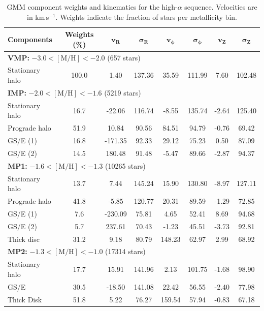 \documentclass[a4paper,12pt]{article}
\begin{document}
\begin{table}[H]
\centering
\begin{tabular}{lccccccc}
\hline
\textbf{Components} & \textbf{Weights (\%)} & $\mathbf{v_R}$ & $\boldsymbol{\sigma_R}$ & $\mathbf{v_\phi}$ & $\boldsymbol{\sigma_\phi}$ & $\mathbf{v_Z}$ & $\boldsymbol{\sigma_Z}$ \\
\hline
\multicolumn{8}{l}{\textbf{VMP:} $-3.0 < \mathrm{[M/H]} < -2.0$ (657 stars)} \\
Stationary halo     & 100.0 &   1.40 & 137.36 &  35.59 & 111.99 &  7.60 & 102.48 \\
\hline
\multicolumn{8}{l}{\textbf{IMP:} $-2.0 < \mathrm{[M/H]} < -1.6$ (5219 stars)} \\
Stationary halo     &  16.7 & -22.06 & 116.74 &  -8.55 & 135.74 & -2.64 & 125.40 \\
Prograde halo       &  51.9 &  10.84 &  90.56 &  84.51 &  94.79 & -0.76 &  69.42 \\
GS/E (1)            &  16.8 &-171.35 &  92.33 &  29.12 &  75.23 &  0.50 &  87.09 \\
GS/E (2)            &  14.5 & 180.48 &  91.48 &  -5.47 &  89.66 & -2.87 &  94.37 \\
\hline
\multicolumn{8}{l}{\textbf{MP1:} $-1.6 < \mathrm{[M/H]} < -1.3$ (10265 stars)} \\
Stationary halo     &   13.7 &   7.44 & 145.24 &  15.90 & 130.80 & -8.97 & 127.11 \\
Prograde halo       &   41.8 &  -5.85 & 120.77 &  20.31 &  89.59 & -1.29 &  72.85 \\
GS/E (1)            &   7.6 &-230.09 &  75.81 &   4.65 &  52.41 &  8.69 &  94.68 \\
GS/E (2)            &   5.7 & 237.61 &  70.43 &  -1.23 &  45.51 & -3.73 &  92.81 \\
Thick disc          &   31.2 &   9.18 &  80.79 & 148.23 &  62.97 &  2.99 &  68.92 \\
\hline
\multicolumn{8}{l}{\textbf{MP2:} $-1.3 < \mathrm{[M/H]} < -1.0$ (17314 stars)} \\
Stationary halo     &  17.7 &  15.91 & 141.96 &   2.13 & 101.75 & -1.68 &  98.90 \\
GS/E                &  30.5 & -18.50 & 141.08 &  22.42 &  56.55 & -2.40 &  77.98 \\
Thick Disk          &  51.8 &   5.22 &  76.27 & 159.54 &  57.94 & -0.83 &  67.18 \\
\hline
\end{tabular}
\caption{GMM component weights and kinematics for the high-$\alpha$ sequence.  
Velocities are in km\,s$^{-1}$. Weights indicate the fraction of stars per metallicity bin.}
\label{tab:gmm_higha_stats}
\end{table}
\end{document}
